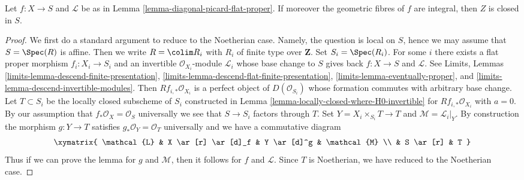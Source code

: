 \begin{lemma}
\label{lemma-get-a-closed}
Let $f : X \to S$ and $\mathcal{L}$ be as in
Lemma \ref{lemma-diagonal-picard-flat-proper}.
If moreover the geometric fibres of $f$ are
integral, then $Z$ is closed in $S$.
\end{lemma}

\begin{proof}
We first do a standard argument to reduce to the Noetherian case.
Namely, the question is local on $S$, hence we may assume that
$S = \Spec(R)$ is affine. Then we write $R = \colim R_i$ with
$R_i$ of finite type over $\mathbf{Z}$. Set $S_i = \Spec(R_i)$.
For some $i$ there exists a flat proper morphism $f_i : X_i \to S_i$
and an invertible $\mathcal{O}_{X_i}$-module $\mathcal{L}_i$
whose base change to $S$ gives back $f : X \to S$ and $\mathcal{L}$.
See Limits, Lemmas \ref{limits-lemma-descend-finite-presentation},
\ref{limits-lemma-descend-flat-finite-presentation},
\ref{limits-lemma-eventually-proper}, and
\ref{limits-lemma-descend-invertible-modules}.
Then $Rf_{i, *}\mathcal{O}_{X_i}$ is a perfect object of
$D(\mathcal{O}_{S_i})$ whose formation commutes with arbitrary base change.
Let $T \subset S_i$ be the locally closed subscheme of $S_i$
constructed in Lemma \ref{lemma-locally-closed-where-H0-invertible}
for $Rf_{i, *}\mathcal{O}_{X_i}$ with $a = 0$.
By our assumption that $f_*\mathcal{O}_X = \mathcal{O}_S$ universally
we see that $S \to S_i$ factors through $T$.
Set $Y = X_i \times_{S_i} T \to T$ and $\mathcal{M} = \mathcal{L}_i|_Y$.
By construction the morphism $g : Y \to T$ satisfies
$g_*\mathcal{O}_Y = \mathcal{O}_T$ universally
and we have a commutative diagram
$$
\xymatrix{
\mathcal{L} & X \ar[r] \ar[d]_f & Y \ar[d]^g & \mathcal{M} \\
& S \ar[r] & T
}
$$
Thus if we can prove the lemma for $g$ and $\mathcal{M}$,
then it follows for $f$ and $\mathcal{L}$.
Since $T$ is Noetherian, we have reduced to the Noetherian case.


\end{proof}
